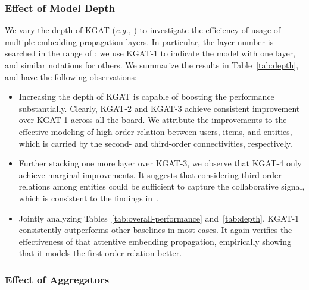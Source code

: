 \documentclass[sigconf]{acmart}
\newcommand{\eg}{\emph{e.g., }}
\theoremstyle{definition}
\begin{document}
\subsubsection{\textbf{Effect of Model Depth}}\label{sec:layer-depth}
We vary the depth of KGAT (\eg ) to investigate the efficiency of usage of multiple embedding propagation layers.
In particular, the layer number is searched in the range of ; we use KGAT-1 to indicate the model with one layer, and similar notations for others.
We summarize the results in Table~\ref{tab:depth}, and have the following observations:
\begin{itemize}[leftmargin=*]
    \item Increasing the depth of KGAT is capable of boosting the performance substantially. Clearly, KGAT-2 and KGAT-3 achieve consistent improvement over KGAT-1 across all the board. We attribute the improvements to the effective modeling of high-order relation between users, items, and entities, which is carried by the second- and third-order connectivities, respectively.
    
    \item Further stacking one more layer over KGAT-3, we observe that KGAT-4 only achieve marginal improvements. It suggests that considering third-order relations among entities could be sufficient to capture the collaborative signal, which is consistent to the findings in~\cite{KGreasoning19,MCRec}.
    
    \item Jointly analyzing Tables~\ref{tab:overall-performance} and~\ref{tab:depth}, KGAT-1 consistently outperforms other baselines in most cases. It again verifies the effectiveness of that attentive embedding propagation, empirically showing that it models the first-order relation better.
\end{itemize}

\subsubsection{\textbf{Effect of Aggregators}}\label{sec:aggregator}
\end{document}
